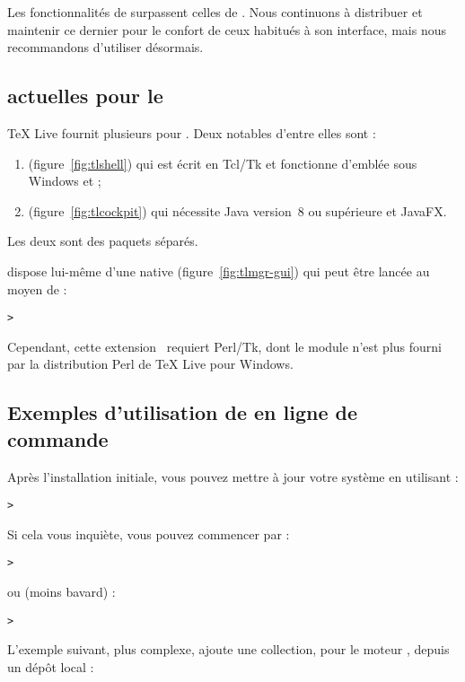 \documentclass[german, english, french]{article}
\renewcommand{\TL}{\TeX{} Live\xspace}%
\begin{document}
Les fonctionnalités de  surpassent celles de . Nous
continuons à distribuer et maintenir ce dernier pour le confort de ceux habitués
à son interface, mais nous recommandons d'utiliser  désormais.

\subsection{\GUI{} actuelles pour le }

\TL{} fournit plusieurs \GUI{} pour . Deux notables d'entre elles
sont :
\begin{enumerate}
\item {} (figure~\ref{fig:tlshell}) qui est écrit en Tcl/Tk et
  fonctionne d'emblée sous Windows et \MacOSX ;
\item {} (figure~\ref{fig:tlcockpit}) qui nécessite Java version~8
  ou supérieure et JavaFX.
\end{enumerate}
Les deux sont des paquets séparés.

 dispose lui-même d'une \GUI{} native (figure~\ref{fig:tlmgr-gui})
qui peut être lancée au moyen de :
\begin{alltt}
> 
\end{alltt}
Cependant, cette extension \GUI\ requiert Perl/Tk, dont le module n'est plus
fourni par la distribution Perl de \TL{} pour Windows.

\subsection{Exemples d'utilisation de  en ligne de commande}

Après l'installation initiale, vous pouvez mettre à jour votre système en
utilisant :

\begin{alltt}
> 
\end{alltt}
Si cela vous inquiète, vous pouvez commencer par :
\begin{alltt}
> 
\end{alltt}
ou (moins bavard) :
\begin{alltt}
> 
\end{alltt}

L'exemple suivant, plus complexe, ajoute une collection, pour le moteur \XeTeX,
depuis un dépôt local :
\end{document}
